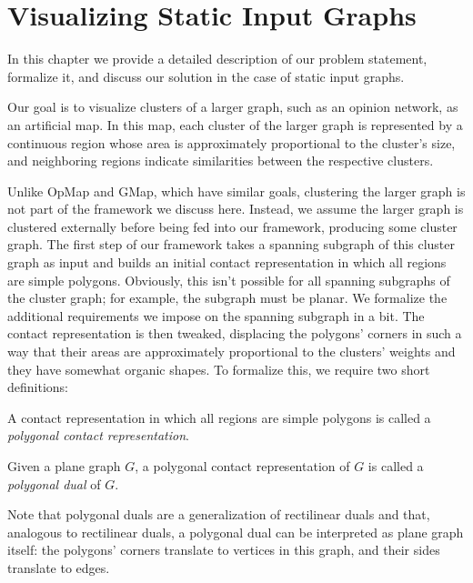 \chapter{Visualizing Static Input Graphs}
\label{chap:visualizing-static-input-graphs}

In this chapter we provide a detailed description of our problem statement, formalize it, and discuss our solution in the case of static input graphs.

Our goal is to visualize clusters of a larger graph, such as an opinion network, as an artificial map.
In this map, each cluster of the larger graph is represented by a continuous region whose area is approximately proportional to the cluster's size, and neighboring regions indicate similarities between the respective clusters.

Unlike OpMap and GMap, which have similar goals, clustering the larger graph is not part of the framework we discuss here.
Instead, we assume the larger graph is clustered externally before being fed into our framework, producing some cluster graph.
The first step of our framework takes a spanning subgraph of this cluster graph as input and builds an initial contact representation in which all regions are simple polygons.
Obviously, this isn't possible for all spanning subgraphs of the cluster graph; for example, the subgraph must be planar.
We formalize the additional requirements we impose on the spanning subgraph in a bit.
The contact representation is then tweaked, displacing the polygons' corners in such a way that their areas are approximately proportional to the clusters' weights and they have somewhat organic shapes.
To formalize this, we require two short definitions:

\begin{definition}
A contact representation in which all regions are simple polygons is called a \emph{polygonal contact representation}.
\end{definition}

\begin{definition}
Given a plane graph $G$, a polygonal contact representation of $G$ is called a \emph{polygonal dual} of $G$.
\end{definition}

Note that polygonal duals are a generalization of rectilinear duals and that, analogous to rectilinear duals, a polygonal dual can be interpreted as plane graph itself: the polygons' corners translate to vertices in this graph, and their sides translate to edges.

